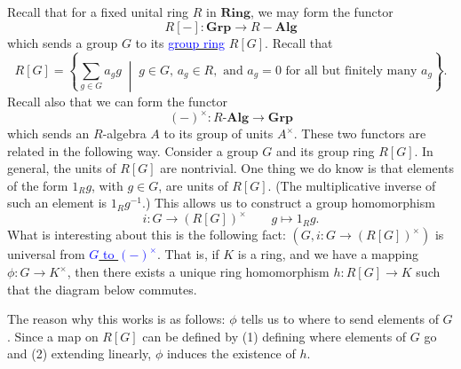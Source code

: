 \begin{example}
    Recall that for a fixed unital ring $R$ in $\textbf{Ring}$, we may 
    form the functor 
    \[
        R[-]: \textbf{Grp} \to R-\textbf{Alg} 
    \]
    which sends a group $G$ to its \hyperref[example:group_ring_functor]{\textcolor{blue}{group ring}} $R[G]$.
    Recall that 
    \[
        R[G] = \left\{ \sum_{g \in G}a_g g \;\middle|\; g \in G, \, a_g \in R, \text{ and } a_g = 0 \text{ for all but finitely many } a_g \right\}.
    \]
    Recall also that we can form the functor 
    \[
        (-)^{\times}: R\textbf{-Alg} \to \textbf{Grp}
    \]
    which sends an $R$-algebra $A$ to its group of units $A^{\times}$.
    These two functors are related in the following way. Consider a group $G$ and 
    its group ring $R[G]$. 
    In general, the units of $R[G]$ are nontrivial. One thing we do know 
    is that 
    elements of the form $1_R g$, with $g \in G$, are units of $R[G]$. (The multiplicative 
    inverse of such an element is $1_R g^{-1}$.) 
    This allows us to construct a group homomorphism
    \[
        i: G \to (R[G])^{\times} \qquad g \mapsto 1_R g.
    \]
    What is interesting about this is the following fact: $(G, i: G \to (R[G])^{\times})$
    is universal from \hyperref[definition:universal_morphism_from_D_to_F]{\textcolor{blue}{$G$ to $(-)^{\times}$}}.
    That is, if $K$ is a 
    ring, and we have a mapping $\phi: G \to K^{\times}$, then there exists a
    unique ring homomorphism $h: R[G] \to K$ such that the diagram below commutes. 
    \begin{center}
        \hspace{1cm}
    \end{center}
    The reason why this works is as follows: $\phi$ tells us to where to send 
    elements of $G$. Since a map on $R[G]$ can be defined by (1) defining where 
    elements of $G$ go and (2) extending linearly, $\phi$ induces the existence of $h$. 
    

\end{example}
